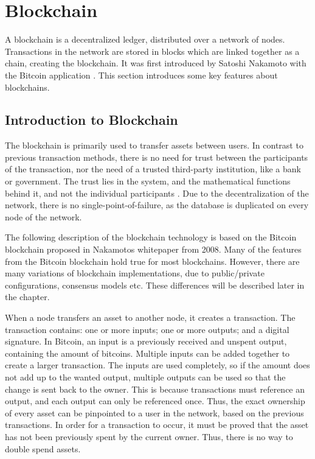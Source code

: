 \section{Blockchain}
A blockchain is a decentralized ledger, distributed over a network of nodes. Transactions in the network are stored in blocks which are linked together as a chain, creating the blockchain. It was first introduced by Satoshi Nakamoto with the Bitcoin application \cite{Nakamoto_bitcoin}.
This section introduces some key features about blockchains.

\subsection{Introduction to Blockchain} \label{blockchain_basics}
The blockchain is primarily used to transfer assets between users. In contrast to previous transaction methods, there is no need for trust between the participants of the transaction, nor the need of a trusted third-party institution, like a bank or government. The trust lies in the system, and the mathematical functions behind it, and not the individual participants \cite{Nofer}. Due to the decentralization of the network, there is no single-point-of-failure, as the database is duplicated on every node of the network.

The following description of the blockchain technology is based on the Bitcoin blockchain proposed in Nakamotos whitepaper from 2008\cite{Nakamoto_bitcoin}. Many of the features from the Bitcoin blockchain hold true for most blockchains. However, there are many variations of blockchain implementations, due to public/private configurations, consensus models etc. These differences will be described later in the chapter.

When a node transfers an asset to another node, it creates a transaction. The transaction contains: one or more inputs; one or more outputs; and a digital signature. In Bitcoin, an input is a previously received and unspent output, containing the amount of bitcoins. Multiple inputs can be added together to create a larger transaction. The inputs are used completely, so if the amount does not add up to the wanted output, multiple outputs can be used so that the change is sent back to the owner. This is because transactions must reference an output, and each output can only be referenced once. Thus, the exact ownership of every asset can be pinpointed to a user in the network, based on the previous transactions. In order for a transaction to occur, it must be proved that the asset has not been previously spent by the current owner. Thus, there is no way to double spend assets. %

